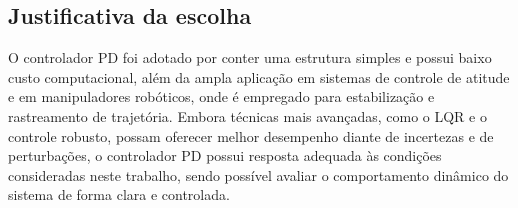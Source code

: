 \subsection{Justificativa da escolha}
O controlador PD foi adotado por conter uma estrutura simples e possui baixo custo computacional, além da ampla aplicação em sistemas de controle de atitude e em manipuladores robóticos, onde é empregado para estabilização e rastreamento de trajetória.
Embora técnicas mais avançadas, como o LQR e o controle robusto, possam oferecer melhor desempenho diante de incertezas e de perturbações, o controlador PD possui resposta adequada às condições consideradas neste trabalho, sendo possível avaliar o comportamento dinâmico do sistema de forma clara e controlada.